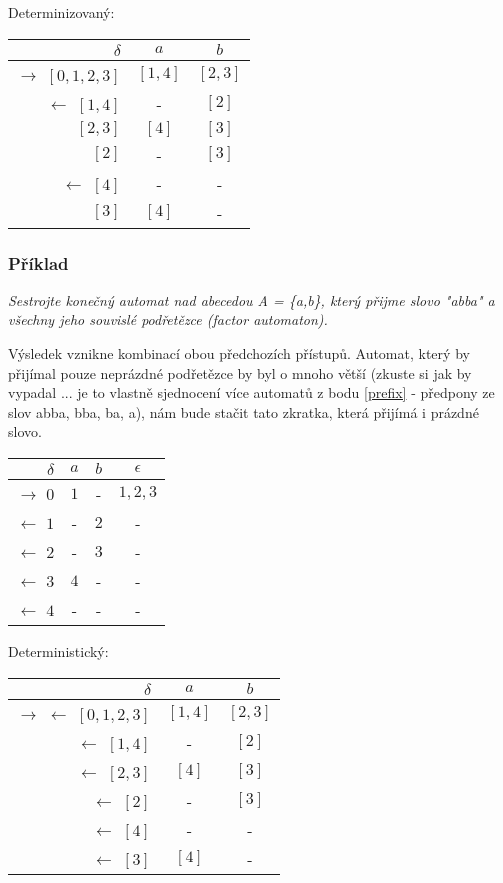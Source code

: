 \documentclass{article}
\begin{document}
Determinizovaný:

\begin{tabular}{|r||c|c|}
\hline
 $\delta$ &      $a$ &   $b$\\
\hline
\hline
$\rightarrow$ $[0,1,2,3]$ &     $[1,4]$ &       $[2,3]$\\
$\leftarrow$ $[1,4]$ &  - &     $[2]$\\
$[2,3]$ &       $[4]$ & $[3]$\\
$[2]$ & - &     $[3]$\\
$\leftarrow$ $[4]$ &    - &     -\\
$[3]$ & $[4]$ & -\\
\hline
\end{tabular}

\subsubsection{Příklad}
\emph{
Sestrojte konečný automat nad abecedou A = \{a,b\}, který přijme slovo "abba" a všechny jeho souvislé podřetězce (factor automaton).
}

Výsledek vznikne kombinací obou předchozích přístupů. Automat, který by přijímal pouze neprázdné podřetězce by byl o mnoho větší (zkuste si jak by vypadal ... je to vlastně sjednocení více automatů z bodu \ref{prefix} - předpony ze slov abba, bba, ba, a), nám bude stačit tato zkratka, která přijímá i prázdné slovo.

\begin{tabular}{|r||c|c|c|}
\hline
 $\delta$ &      $a$ &   $b$ &   $\epsilon$\\
\hline
\hline
$\rightarrow$ $0$ &     $1$ &   - &     $1,2,3$\\
$\leftarrow$ $1$ &   - &     $2$ &   -\\
$\leftarrow$ $2$ &   - &     $3$ &   -\\
$\leftarrow$ $3$ &   $4$ &   - &     -\\
$\leftarrow$ $4$ &      - &     - &     -\\
\hline
\end{tabular}

Deterministický:

\begin{tabular}{|r||c|c|}
\hline
 $\delta$ &      $a$ &   $b$\\
\hline
\hline
$\rightarrow$ $\leftarrow$ $[0,1,2,3]$ &        $[1,4]$ &       $[2,3]$\\
$\leftarrow$ $[1,4]$ &  - &     $[2]$\\
$\leftarrow$ $[2,3]$ &  $[4]$ & $[3]$\\
$\leftarrow$ $[2]$ &    - &     $[3]$\\
$\leftarrow$ $[4]$ &    - &     -\\
$\leftarrow$ $[3]$ &    $[4]$ & -\\
\hline
\end{tabular}
\end{document}
